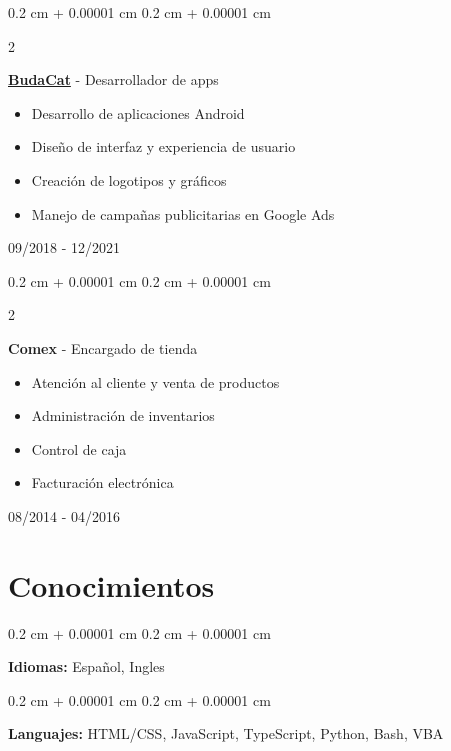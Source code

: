 \documentclass[12pt, letterpaper]{article}
\newenvironment{highlights}{
    \begin{itemize}[
        topsep=0.10 cm,
        parsep=0.10 cm,
        partopsep=0pt,
        itemsep=0pt,
        leftmargin=0.4 cm + 10pt
    ]
}{
    \end{itemize}
} %
\newenvironment{onecolentry}{
    \begin{adjustwidth}{
        0.2 cm + 0.00001 cm
    }{
        0.2 cm + 0.00001 cm
    }
}{
    \end{adjustwidth}
} %
\newenvironment{twocolentry}[2][]{
    \onecolentry
    \def\secondColumn{#2}
    \setcolumnwidth{\fill, 4.5 cm}
    \begin{paracol}{2}
}{
    \switchcolumn \raggedleft \secondColumn
    \end{paracol}
    \endonecolentry
} %
\let\hrefWithoutArrow\href
\renewcommand{\href}[2]{\hrefWithoutArrow{#1}{\mbox{\ifthenelse{\equal{#2}{}}{ }{#2 }\raisebox{.15ex}{\footnotesize \faExternalLink*}}}}
\begin{document}
\vspace{0.3 cm}

\begin{twocolentry}{

        09/2018 - 12/2021
    }
    \hrefWithoutArrow{https://play.google.com/store/apps/developer?id=BudaCat}{\textbf{\color{black}BudaCat}} - Desarrollador de apps
    \begin{highlights}
        \item Desarrollo de aplicaciones Android
        \item Diseño de interfaz y experiencia de usuario
        \item Creación de logotipos y gráficos
        \item Manejo de campañas publicitarias en Google Ads
    \end{highlights}
\end{twocolentry}

\vspace{0.3 cm}

\begin{twocolentry}{

        08/2014 - 04/2016
    }
    \textbf{Comex} - Encargado de tienda
    \begin{highlights}
        \item Atención al cliente y venta de productos
        \item Administración de inventarios
        \item Control de caja
        \item Facturación electrónica
    \end{highlights}
\end{twocolentry}

\vspace{0.5 cm}

\section{Conocimientos}

\vspace{0.2 cm}

\begin{onecolentry}
    \textbf{Idiomas:} Español, Ingles
\end{onecolentry}

\vspace{0.2 cm}

\begin{onecolentry}
    \textbf{Languajes:} HTML/CSS, JavaScript, TypeScript, Python, Bash, VBA
\end{onecolentry}
\end{document}
